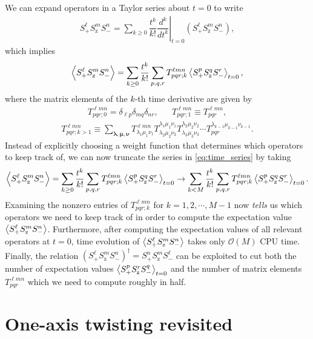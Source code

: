 \documentclass[aps,notitlepage,nofootinbib,11pt]{revtex4-1}
\newcommand{\f}[2]{\dfrac{#1}{#2}} %
\newcommand{\p}[1]{\left(#1\right)} %
\renewcommand{\v}{\bm} %
\newcommand{\bk}{\Braket} %
\renewcommand{\O}{\mathcal{O}}
\newcommand{\z}{\text{z}}
\newcommand{\1}{\mathds{1}}
\begin{document}
We can expand operators in a Taylor series about $t=0$ to write
\begin{align}
  S_+^\ell S_\z^m S_-^n
  = \sum_{k\ge0} \f{t^k}{k!}
  \left.\f{d^k}{dt^k}\right|_{t=0} \p{S_+^\ell S_\z^m S_-^n},
\end{align}
which implies
\begin{align}
  \bk{S_+^\ell S_\z^m S_-^n}
  = \sum_{k\ge0} \f{t^k}{k!}
  \sum_{p,q,r} T^{\ell m n}_{pqr;k} \bk{S_+^p S_\z^q S_-^r}_{t=0},
  \label{eq:time_series}
\end{align}
where the matrix elements of the $k$-th time derivative are given by
\begin{align}
  T^{\ell m n}_{pqr;0}=\delta_{\ell p}\delta_{mq}\delta_{nr},
  &&
  T^{\ell m n}_{pqr;1}\equiv T^{\ell m n}_{pqr},
\end{align}
\begin{align}
  T^{\ell mn}_{pqr;k>1}
  \equiv \sum_{\v\lambda,\v\mu,\v\nu}
  T^{\ell mn}_{\lambda_1 \mu_1 \nu_1}
  T^{\lambda_1 \mu_1 \nu_1}_{\lambda_2 \mu_2 \nu_2}
  T^{\lambda_2 \mu_2 \nu_2}_{\lambda_3 \mu_3 \nu_3}
  \cdots T^{\lambda_{k-1} \mu_{k-1} \nu_{k-1}}_{pqr}.
\end{align}
Instead of explicitly choosing a weight function that determines which
operators to keep track of, we can now truncate the series in
\eqref{eq:time_series} by taking
\begin{align}
  \bk{S_+^\ell S_\z^m S_-^n}
  = \sum_{k\ge0} \f{t^k}{k!}
  \sum_{p,q,r} T^{\ell m n}_{pqr;k} \bk{S_+^p S_\z^q S_-^r}_{t=0}
  \to \sum_{k<M} \f{t^k}{k!}
  \sum_{p,q,r} T^{\ell m n}_{pqr;k} \bk{S_+^p S_\z^q S_-^r}_{t=0}.
\end{align}
Examining the nonzero entries of $T^{\ell mn}_{pqr;k}$ for
$k=1,2,\cdots,M-1$ now {\it tells} us which operators we need to keep
track of in order to compute the expectation value
$\bk{S_+^\ell S_\z^m S_-^n}$.  Furthermore, after computing the
expectation values of all relevant operators at $t=0$, time evolution
of $\bk{S_+^\ell S_\z^m S_-^n}$ takes only $\O\p{M}$ CPU time.
Finally, the relation
$\p{S_+^\ell S_\z^m S_-^n}^\dag=S_+^n S_\z^m S_-^\ell$ can be
exploited to cut both the number of expectation values
$\bk{S_+^p S_\z^r S_-^q}_{t=0}$ and the number of matrix elements
$T^{\ell mn}_{pqr}$ which we need to compute roughly in half.


\section{One-axis twisting revisited}
\end{document}
